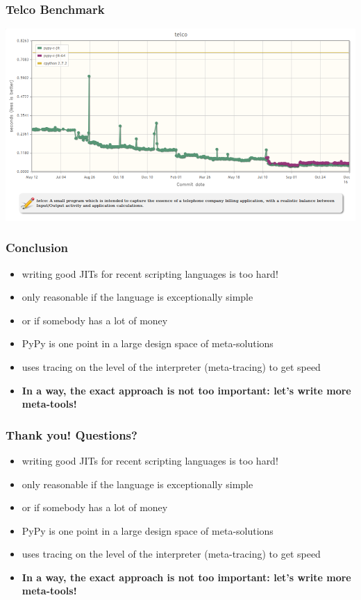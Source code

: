 \documentclass[utf8x]{beamer}
\begin{document}
\begin{frame}
  \frametitle{Telco Benchmark}
  \includegraphics[scale=0.3]{figures/telco.png}
\end{frame}

\begin{frame}
  \frametitle{Conclusion}
  \begin{itemize}
      \item writing good JITs for recent scripting languages is too hard!
      \item only reasonable if the language is exceptionally simple
      \item or if somebody has a lot of money
      \item PyPy is one point in a large design space of meta-solutions
      \item uses tracing on the level of the interpreter (meta-tracing) to get speed
      \pause
      \item \textbf{In a way, the exact approach is not too important: let's write more meta-tools!}
  \end{itemize}
\end{frame}

\begin{frame}
  \frametitle{Thank you! Questions?}
  \begin{itemize}
      \item writing good JITs for recent scripting languages is too hard!
      \item only reasonable if the language is exceptionally simple
      \item or if somebody has a lot of money
      \item PyPy is one point in a large design space of meta-solutions
      \item uses tracing on the level of the interpreter (meta-tracing) to get speed
      \item \textbf{In a way, the exact approach is not too important: let's write more meta-tools!}
  \end{itemize}
\end{frame}
\end{document}
